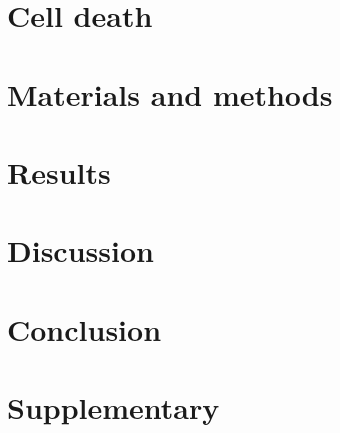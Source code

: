 \documentclass[10pt]{article}
\begin{document}
	\section{Cell death}
	
	\label{section:Chap_Cell_Death}
	\newpage
	
	\section{Materials and methods}
	
	\label{section:Chap_Material_and_Methods}
	\newpage
	
	\section{Results}
	
	\label{section:Chap_Results}
	\newpage
	
	\section{Discussion}
	
	\label{section:Chap_Discussion}
	\newpage
	
	\section{Conclusion}
	
	\label{section:Chap_Conclusion}
	\newpage
	
%	
	
	\section*{Supplementary}
	
	\label{section:Chap_Supplementary}
	\newpage
	

	
	
\end{document}
